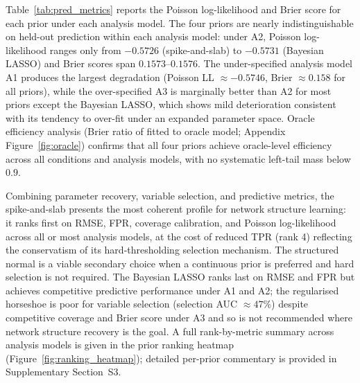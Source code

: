\documentclass[12pt]{article}
\begin{document}
Table~\ref{tab:pred_metrics} reports the Poisson log-likelihood and Brier score for each prior under each analysis model. The four priors are nearly indistinguishable on held-out prediction within each analysis model: under A2, Poisson log-likelihood ranges only from $-0.5726$ (spike-and-slab) to $-0.5731$ (Bayesian LASSO) and Brier scores span $0.1573$--$0.1576$. The under-specified analysis model A1 produces the largest degradation (Poisson LL $\approx -0.5746$, Brier $\approx 0.158$ for all priors), while the over-specified A3 is marginally better than A2 for most priors except the Bayesian LASSO, which shows mild deterioration consistent with its tendency to over-fit under an expanded parameter space. Oracle efficiency analysis (Brier ratio of fitted to oracle model; Appendix Figure~\ref{fig:oracle}) confirms that all four priors achieve oracle-level efficiency across all conditions and analysis models, with no systematic left-tail mass below $0.9$.

\begin{table}[H]
\centering
\caption{Predictive performance metrics across analysis models and prior families. Poisson log-likelihood (Pois.\ LL) and Brier score are averaged over simulation replicates; standard errors (SE) are shown in parentheses. Higher Poisson log-likelihood (less negative) and lower Brier score indicate better 
predictive performance. A1: under-specified ($P_{\mathrm{fit}}=1$, interaction terms omitted); A2: correctly specified ($P_{\mathrm{fit}}=2$); A3: over-specified ($P_{\mathrm{fit}}=3$, spurious higher-order terms included).} \label{tab:pred_metrics}

\end{table}

Combining parameter recovery, variable selection, and predictive metrics, the spike-and-slab presents the most coherent profile for network structure learning: it ranks first on RMSE, FPR, coverage calibration, and Poisson log-likelihood across all or most analysis models, at the cost of reduced TPR (rank 4) reflecting the conservatism of its hard-thresholding selection mechanism. The structured normal is a viable secondary choice when a continuous prior is preferred and hard selection is not required. The Bayesian LASSO ranks last on RMSE and FPR but achieves competitive predictive performance under A1 and A2; the regularised horseshoe is poor for variable selection (selection AUC $\approx 47\%$) despite competitive coverage and Brier score under A3 and so is not recommended where network structure recovery is the goal. A full rank-by-metric summary across analysis models is given in the prior ranking heatmap (Figure~\ref{fig:ranking_heatmap}); detailed per-prior commentary is provided in Supplementary Section~S3.
\end{document}
